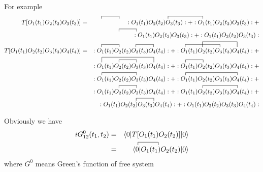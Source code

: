 \documentclass[12pt]{book}
\begin{document}
	For example
	\begin{eqnarray}
		\contraction{T[O_1(t_1)O_2(t_2)O_3(t_3)]=\quad\ :}{O}{{}_1(t_1)}{O}
		\contraction{T[O_1(t_1)O_2(t_2)O_3(t_3)]=\quad\ :O_1(t_1)O_2(t_2)O_3(t_3):+:}{O}{{}_1(t_1)O_2(t_2)}{O}
	T[O_1(t_1)O_2(t_2)O_3(t_3)]&=&:O_1(t_1)O_2(t_2)O_3(t_3):+:O_1(t_1)O_2(t_2)O_3(t_3):+\nonumber\\
		\contraction{\qquad\,  :O_1(t_1)}{O}{{}_2(t_2)}{O}
		&&:O_1(t_1)O_2(t_2)O_3(t_3):+:O_1(t_1)O_2(t_2)O_3(t_3):\\
		\contraction{T[O_1(t_1)O_2(t_2)O_3(t_3)O_4(t_4)]=\quad\ :}{O}{{}_1(t_1)}{O}
		\contraction{T[O_1(t_1)O_2(t_2)O_3(t_3)O_4(t_4)]=\quad\ :O_1(t_1)O_2(t_2)}{O}{{}_3(t_3)}{O}
		\contraction{T[O_1(t_1)O_2(t_2)O_3(t_3)O_4(t_4)]=\quad\ :O_1(t_1)O_2(t_2)O_3(t_3)O_4(t_4):+:}{O}{{}_1(t_1)O_2(t_2)}{O}
		\contraction[2ex]{T[O_1(t_1)O_2(t_2)O_3(t_3)O_4(t_4)]=\quad\ :O_1(t_1)O_2(t_2)O_3(t_3)O_4(t_4):+:O_1(t_1)}{O}{{}_2(t_2)O_3(t_3)}{O}
	T[O_1(t_1)O_2(t_2)O_3(t_3)O_4(t_4)]&=&:O_1(t_1)O_2(t_2)O_3(t_3)O_4(t_4):+:O_1(t_1)O_2(t_2)O_3(t_3)O_4(t_4):+\nonumber\\
		\contraction[2ex]{\qquad\, :}{O}{{}_1(t_1)O_2(t_2)O_3(t_3)}{O}
		\contraction{\qquad\, :O_1(t_1)}{O}{{}_2(t_2)}{O}
		\contraction{\qquad\, :O_1(t_1)O_2(t_2)O_3(t_3)O_4(t_4):+:}{O}{{}_1(t_1)}{O}
		&&:O_1(t_1)O_2(t_2)O_3(t_3)O_4(t_4):+:O_1(t_1)O_2(t_2)O_3(t_3)O_4(t_4):+\nonumber\\
		\contraction{\qquad\, :}{O}{{}_1(t_1)O_2(t_2)}{O}
		\contraction{\qquad\, :O_1(t_1)O_2(t_2)O_3(t_3)O_4(t_4):+:}{O}{{}_1(t_1)O_2(t_2)O_3(t_3)}{O}
		&&:O_1(t_1)O_2(t_2)O_3(t_3)O_4(t_4):+:O_1(t_1)O_2(t_2)O_3(t_3)O_4(t_4):+\nonumber\\
		\contraction{\qquad\, :O_1(t_1)}{O}{{}_2(t_2)}{O}
		\contraction{\qquad\, :O_1(t_1)O_2(t_2)O_3(t_3)O_4(t_4):+:O_1(t_1)}{O}{{}_2(t_2)O_3(t_3)}{O}
		&&:O_1(t_1)O_2(t_2)O_3(t_3)O_4(t_4):+:O_1(t_1)O_2(t_2)O_3(t_3)O_4(t_4):+\nonumber\\
		\contraction{\qquad\, :O_1(t_1)O_2(t_2)}{O}{{}_3(t_3)}{O}
		&&:O_1(t_1)O_2(t_2)O_3(t_3)O_4(t_4):+:O_1(t_1)O_2(t_2)O_3(t_3)O_4(t_4):
	\end{eqnarray}
	
	Obviously we have 
	\begin{eqnarray}
		iG^0_{12}(t_1,t_2)&=&\langle0|T[O_1(t_1)O_2(t_2)]|0\rangle\\
		\contraction{\qquad\ \, \langle0|}{O}{{}_1(t_1)}{O}
		&=&\langle0|O_1(t_1)O_2(t_2)|0\rangle
	\end{eqnarray}
	where $G^0$ means Green's function of free system
	
\end{document}
